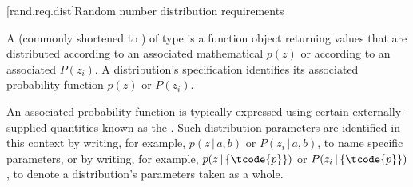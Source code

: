 
[rand.req.dist]{Random number distribution requirements}%
%

\pnum
A 
(commonly shortened to )
 of type 
is a function object
returning values
that are distributed according to
an associated mathematical 
$p(z)$
or according to
an associated 
$P(z_i)$.
A distribution's specification
identifies its associated probability function
$p(z)$ or $P(z_i)$.

\pnum
An associated probability function is typically expressed
using certain externally-supplied quantities
known as the .
Such distribution parameters are identified
in this context by writing, for example,
  $p(z\,|\,a,b)$ or $P(z_i\,|\,a,b)$,
  to name specific parameters,
or by writing, for example,
  $p(z\,|\left\{\tcode{p}\right\})$
  or $P(z_i\,|\left\{\tcode{p}\right\})$,
  to denote a distribution's parameters  taken as a whole.

